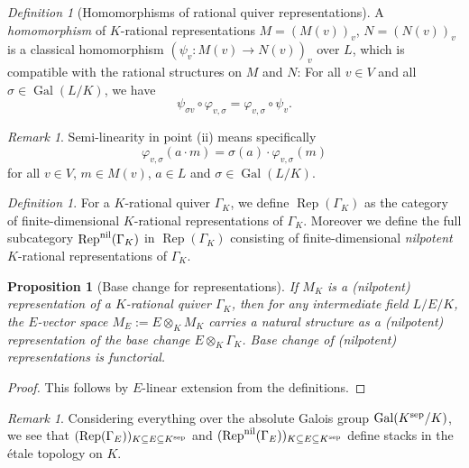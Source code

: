 \documentclass[a4paper,12pt,reqno]{amsart}
\DeclareMathOperator{\Gal}{\mathrm {Gal}}
\DeclareMathOperator{\Rep}{\mathrm{Rep}}
\theoremstyle{plain}
\newtheorem{proposition}[theorem]{Proposition}
\theoremstyle{remark}
\newtheorem{remark}[theorem]{Remark}
\newtheorem{definition}[theorem]{Definition}
\begin{document}
  \begin{definition}[Homomorphisms of rational quiver representations]\label{def:rationalrepresentationhom}
    A {\em homomorphism} of $K$-rational representations $M=(M(v))_v$, $N=(N(v))_v$ is a classical homomorphism $\left(\psi_v\colon M(v)\to N(v)\right)_v$ over $L$, which is compatible with the rational structures on $M$ and $N$: For all $v\in V$ and all $\sigma\in\Gal(L/K)$, we have
    \begin{equation}
      \psi_{\sigma v}\circ\varphi_{v,\sigma}=\varphi_{v,\sigma}\circ\psi_v.
      \label{eq:koecheractiononrephom}
    \end{equation}
  \end{definition}
  
  \begin{remark}
    Semi-linearity in point (ii) means specifically
    \begin{equation}
      \varphi_{v,\sigma}(a\cdot m)=\sigma(a)\cdot\varphi_{v,\sigma}(m)
    \end{equation}
    for all $v\in V$, $m\in M(v)$, $a\in L$ and $\sigma\in\Gal(L/K)$.
  \end{remark}

  \begin{definition}
    For a $K$-rational quiver $\Gamma_K$, we define $\Rep(\Gamma_K)$ as the category of finite-dimensional $K$-rational representations of $\Gamma_K$. Moreover we define the full subcategory $\Rep^{\rm nil}(\Gamma_K)$ in $\Rep(\Gamma_K)$ consisting of finite-dimensional {\em nilpotent} $K$-rational representations of $\Gamma_K$.
  \end{definition}

  \begin{proposition}[Base change for representations]
    If $M_K$ is a (nilpotent) representation of a $K$-rational quiver $\Gamma_K$, then for any intermediate field $L/E/K$, the $E$-vector space $M_E:=E\otimes_KM_K$ carries a natural structure as a (nilpotent) representation of the base change $E\otimes_K\Gamma_K$. Base change of (nilpotent) representations is functorial.
  \end{proposition}

  \begin{proof}
    This follows by $E$-linear extension from the definitions.
  \end{proof}

  \begin{remark}
    Considering everything over the absolute Galois group $\Gal(K^{\rm sep}/K)$, we see that $(\Rep(\Gamma_E))_{K\subseteq E\subseteq K^{\rm sep}}$ and $(\Rep^{\rm nil}(\Gamma_E))_{K\subseteq E\subseteq K^{\rm sep}}$ define stacks in the \'etale topology on $K$.
  \end{remark}
\end{document}

